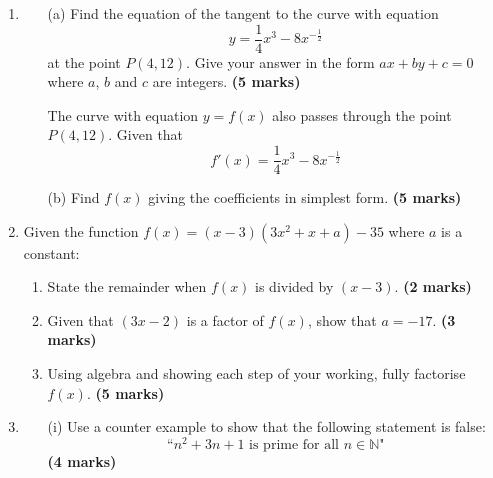 \documentclass{../Templates/sbs-exam}
\newcommand{\imarks}[1]{\hfill \textbf{(#1 marks)}}
\begin{document}
\begin{enumerate}
\begin{enumerate}[leftmargin=*, label=\textbf{\alph*.}]
        The point $P$ lies on the curve and has $x$ coordinate $\frac{1}{2}$
        
        \item[(b)] Find an equation of the normal to the curve at $P$, writing your answer in the form $ax + by + c = 0$, where $a$, $b$ and $c$ are integers to be found. \imarks{5}
    \end{enumerate}

\vspace{8cm}

\item %
\begin{enumerate}
        \item[(a)] Find the equation of the tangent to the curve with equation
        \[
        y = \frac{1}{4}x^3 - 8x^{-\frac{1}{2}}
        \]
        at the point \( P(4, 12) \). Give your answer in the form \( ax + by + c = 0 \) where \( a \), \( b \) and \( c \) are integers. \imarks{5}
        
        The curve with equation \( y = f(x) \) also passes through the point \( P(4, 12) \). Given that
        \[
        f'(x) = \frac{1}{4}x^3 - 8x^{-\frac{1}{2}}
        \]
        
        \item[(b)] Find \( f(x) \) giving the coefficients in simplest form. \imarks{5}
    \end{enumerate}

\vspace{8cm}

\item %

Given the function \( f(x) = (x - 3)(3x^2 + x + a) - 35 \) where \( a \) is a constant:
          \begin{enumerate}
              \item State the remainder when \( f(x) \) is divided by \( (x - 3) \). \imarks{2}
              \item Given that \( (3x - 2) \) is a factor of \( f(x) \), show that \( a = -17 \). \imarks{3}
              \item Using algebra and showing each step of your working, fully factorise \( f(x) \). \imarks{5}
          \end{enumerate}

\vspace{8cm}


\item %
\begin{enumerate}
    \item[(i)] Use a counter example to show that the following statement is false:
    \begin{equation*}
        \text{``}n^2 + 3n + 1 \text{ is prime for all } n \in \mathbb{N}\text{"}
    \end{equation*}\imarks{4}
    

\end{enumerate}
\end{enumerate}
\end{document}

